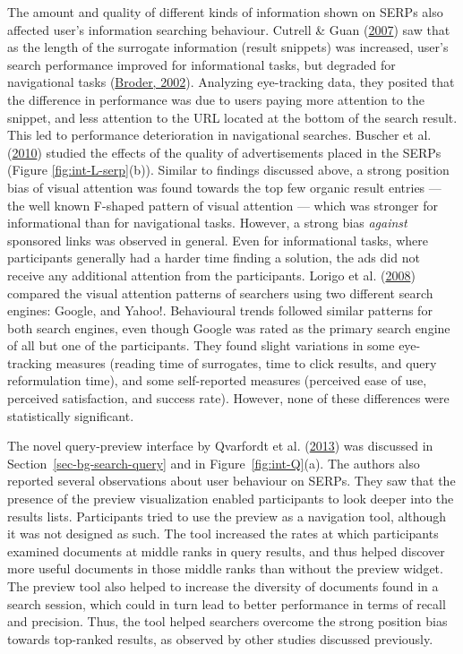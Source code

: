 \documentclass[letterpaper, nobind]{templates/ociamthesis}
\begin{document}
The amount and quality of different kinds of information shown on SERPs
also affected user's information searching behaviour. Cutrell \& Guan (\protect\hyperlink{ref-104}{2007}) saw that as
the length of the surrogate information (result snippets) was increased,
user's search performance improved for informational tasks, but degraded
for navigational tasks (\protect\hyperlink{ref-broder2002taxonomy}{Broder, 2002}). Analyzing eye-tracking
data, they posited that the difference in performance was due to users
paying more attention to the snippet, and less attention to the URL
located at the bottom of the search result. This led to performance
deterioration in navigational searches. Buscher et al. (\protect\hyperlink{ref-115}{2010}) studied the effects of the
quality of advertisements placed in the SERPs (Figure \ref{fig:int-L-serp}(b)). Similar to findings discussed above, a
strong position bias of visual attention was found towards the top few
organic result entries --- the well known F-shaped pattern of visual
attention --- which was stronger for informational than for navigational
tasks. However, a strong bias \emph{against} sponsored links was observed in
general. Even for informational tasks, where participants generally had
a harder time finding a solution, the ads did not receive any additional
attention from the participants. Lorigo et al. (\protect\hyperlink{ref-108}{2008}) compared the visual attention
patterns of searchers using two different search engines: Google, and
Yahoo!. Behavioural trends followed similar patterns for both search
engines, even though Google was rated as the primary search engine of
all but one of the participants. They found slight variations in some
eye-tracking measures (reading time of surrogates, time to click
results, and query reformulation time), and some self-reported measures
(perceived ease of use, perceived satisfaction, and success rate).
However, none of these differences were statistically significant.

The novel query-preview interface by Qvarfordt et al. (\protect\hyperlink{ref-121}{2013}) was discussed in
Section~\ref{sec-bg-search-query} and in
Figure~\ref{fig:int-Q}(a).
The authors also reported several observations about user behaviour on
SERPs. They saw that the presence of the preview visualization enabled
participants to look deeper into the results lists. Participants tried
to use the preview as a navigation tool, although it was not designed as
such. The tool increased the rates at which participants examined
documents at middle ranks in query results, and thus helped discover
more useful documents in those middle ranks than without the preview
widget. The preview tool also helped to increase the diversity of
documents found in a search session, which could in turn lead to better
performance in terms of recall and precision. Thus, the tool helped
searchers overcome the strong position bias towards top-ranked results,
as observed by other studies discussed previously.
\end{document}
